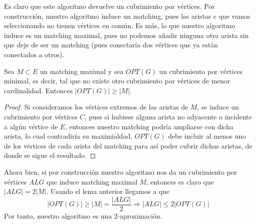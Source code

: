 \documentclass[twoside]{article}
\begin{document}
\begin{solucion}
Es claro que este algoritmo devuelve un cubrimiento por vértices. Por construcción, nuestro algoritmo induce un matching, pues las aristas $e$ que vamos seleccionando no tienen vértices en común. Es más, lo que nuestro algoritmo induce es un matching maximal, pues no podemos añadir ninguna otra arista sin que deje de ser un matching (pues conectaría dos vértices que ya están conectados a otros). 
\begin{lemma}
Sea $M \subset E$ un matching maximal y sea $OPT(G)$ un cubrimiento por vértices minimal, es decir, tal que no existe otro cubrimiento por vértices de menor cardinalidad. Entonces $|OPT(G)|\geq |M|$.
\end{lemma}
\begin{proof}
Si consideramos los vértices extremos de las aristas de $M$, se induce un cubrimiento por vértices $C$, pues si hubiese alguna arista no adyacente o incidente a algún vértice de $E$, entonces nuestro matching podría ampliarse con dicha arista, lo cual contradiría su maximialdad. $OPT(G)$ debe incluir al menos uno de los vértices de cada arista del matching para así poder cubrir dichas aristas, de donde se sigue el resultado.
\end{proof}
Ahora bien, si por construcción nuestro algoritmo nos da un cubrimiento por vértices $ALG$ que induce matching maximal $M$, entonces es claro que $|ALG| = 2|M|$. Usando el lema anterior llegamos a que
$$
|OPT(G)| \geq |M| = \frac{|ALG|}{2} \Rightarrow |ALG| \leq 2|OPT(G)|
$$
Por tanto, nuestro algoritmo es una $2$-aproximación. \end{solucion}



\newpage
\end{document}
